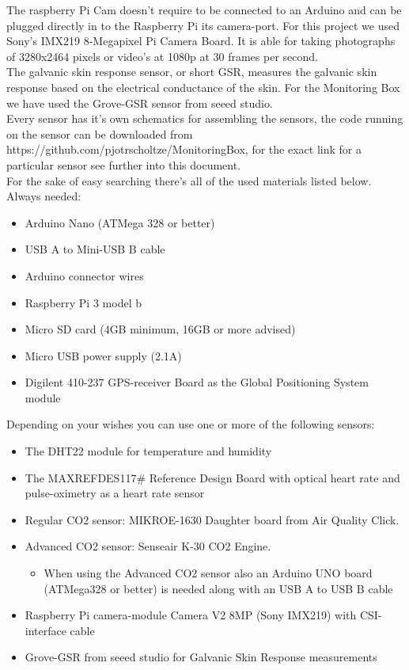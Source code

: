 \documentclass{report}
\begin{document}
The raspberry Pi Cam doesn't require to be connected to an Arduino and can be plugged directly in to the Raspberry Pi its camera-port. For this project we used Sony's IMX219 8-Megapixel Pi Camera Board. It is able for taking photographs of 3280x2464 pixels or video's at 1080p at 30 frames per second. \\

The galvanic skin response sensor, or short GSR, measures the galvanic skin response based on the electrical conductance of the skin. For the Monitoring Box we have used the Grove-GSR sensor from seeed studio.\\

Every sensor has it's own schematics for assembling the sensors, the code running on the sensor can be downloaded from https://github.com/pjotrscholtze/MonitoringBox, for the exact link for a particular sensor see further into this document.  \\

For the sake of easy searching there's all of the used materials listed below.\\

Always needed:

\begin{itemize}

\item Arduino Nano (ATMega 328 or better)
\item USB A to Mini-USB B cable
\item Arduino connector wires
\item Raspberry Pi 3 model b
\item Micro SD card (4GB minimum, 16GB or more advised)
\item Micro USB power supply (2.1A)
\item Digilent 410-237 GPS-receiver Board as the Global Positioning System module
\end{itemize}
Depending on your wishes you can use one or more of the following sensors: 
\begin{itemize}
\item The DHT22 module for temperature and humidity
\item The MAXREFDES117\# Reference Design Board with optical heart rate and pulse-oximetry as a heart rate sensor
\item Regular CO2 sensor: MIKROE-1630 Daughter board from Air Quality Click. 
\item Advanced CO2 sensor: Senseair K-30 CO2 Engine.
\begin{itemize}
\item When using the Advanced CO2 sensor also an Arduino UNO board (ATMega328 or better) is needed along with an USB A to USB B cable 
\end{itemize} 
\item Raspberry Pi camera-module Camera V2 8MP (Sony IMX219) with CSI-interface cable
\item Grove-GSR from seeed studio for Galvanic Skin Response measurements
\end{itemize}
\end{document}
